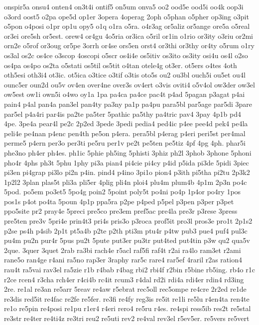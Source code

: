 {onspir5a
onsu4
onten4
on3t4i
ontif5
on5um
onva5
oo2
ood5e
ood5i
oo4k
oop3i
o3ord
oost5
o2pa
ope5d
op1er
3opera
4operag
2oph
o5phan
o5pher
op3ing
o3pit
o5pon
o4posi
o1pr
op1u
opy5
o1q
o1ra
o5ra.
o4r3ag
or5aliz
or5ange
ore5a
o5real
or3ei
ore5sh
or5est.
orew4
or4gu
4o5ria
or3ica
o5ril
or1in
o1rio
or3ity
o3riu
or2mi
orn2e
o5rof
or3oug
or5pe
3orrh
or4se
ors5en
orst4
or3thi
or3thy
or4ty
o5rum
o1ry
os3al
os2c
os4ce
o3scop
4oscopi
o5scr
os4i4e
os5itiv
os3ito
os3ity
osi4u
os4l
o2so
os4pa
os4po
os2ta
o5stati
os5til
os5tit
o4tan
otele4g
ot3er.
ot5ers
o4tes
4oth
oth5esi
oth3i4
ot3ic.
ot5ica
o3tice
o3tif
o3tis
oto5s
ou2
ou3bl
ouch5i
ou5et
ou4l
ounc5er
oun2d
ou5v
ov4en
over4ne
over3s
ov4ert
o3vis
oviti4
o5v4ol
ow3der
ow3el
ow5est
ow1i
own5i
o4wo
oy1a
1pa
pa4ca
pa4ce
pac4t
p4ad
5pagan
p3agat
p4ai
pain4
p4al
pan4a
pan3el
pan4ty
pa3ny
pa1p
pa4pu
para5bl
par5age
par5di
3pare
par5el
p4a4ri
par4is
pa2te
pa5ter
5pathic
pa5thy
pa4tric
pav4
3pay
4p1b
pd4
4pe.
3pe4a
pear4l
pe2c
2p2ed
3pede
3pedi
pedia4
ped4ic
p4ee
pee4d
pek4
pe4la
peli4e
pe4nan
p4enc
pen4th
pe5on
p4era.
pera5bl
p4erag
p4eri
peri5st
per4mal
perme5
p4ern
per3o
per3ti
pe5ru
per1v
pe2t
pe5ten
pe5tiz
4pf
4pg
4ph.
phar5i
phe3no
ph4er
ph4es.
ph1ic
5phie
ph5ing
5phisti
3phiz
ph2l
3phob
3phone
5phoni
pho4r
4phs
ph3t
5phu
1phy
pi3a
pian4
pi4cie
pi4cy
p4id
p5ida
pi3de
5pidi
3piec
pi3en
pi4grap
pi3lo
pi2n
p4in.
pind4
p4ino
3pi1o
pion4
p3ith
pi5tha
pi2tu
2p3k2
1p2l2
3plan
plas5t
pli3a
pli5er
4plig
pli4n
ploi4
plu4m
plum4b
4p1m
2p3n
po4c
5pod.
po5em
po3et5
5po4g
poin2
5point
poly5t
po4ni
po4p
1p4or
po4ry
1pos
pos1s
p4ot
po4ta
5poun
4p1p
ppa5ra
p2pe
p4ped
p5pel
p3pen
p3per
p3pet
ppo5site
pr2
pray4e
5preci
pre5co
pre3em
pref5ac
pre4la
pre3r
p3rese
3press
pre5ten
pre3v
5pri4e
prin4t3
pri4s
pris3o
p3roca
prof5it
pro3l
pros3e
pro1t
2p1s2
p2se
ps4h
p4sib
2p1t
pt5a4b
p2te
p2th
pti3m
ptu4r
p4tw
pub3
pue4
puf4
pul3c
pu4m
pu2n
pur4r
5pus
pu2t
5pute
put3er
pu3tr
put4ted
put4tin
p3w
qu2
qua5v
2que.
3quer
3quet
2rab
ra3bi
rach4e
r5acl
raf5fi
raf4t
r2ai
ra4lo
ram3et
r2ami
rane5o
ran4ge
r4ani
ra5no
rap3er
3raphy
rar5c
rare4
rar5ef
4raril
r2as
ration4
rau4t
ra5vai
rav3el
ra5zie
r1b
r4bab
r4bag
rbi2
rbi4f
r2bin
r5bine
rb5ing.
rb4o
r1c
r2ce
rcen4
r3cha
rch4er
r4ci4b
rc4it
rcum3
r4dal
rd2i
rdi4a
rdi4er
rdin4
rd3ing
2re.
re1al
re3an
re5arr
5reav
re4aw
r5ebrat
rec5oll
rec5ompe
re4cre
2r2ed
re1de
re3dis
red5it
re4fac
re2fe
re5fer.
re3fi
re4fy
reg3is
re5it
re1li
re5lu
r4en4ta
ren4te
re1o
re5pin
re4posi
re1pu
r1er4
r4eri
rero4
re5ru
r4es.
re4spi
ress5ib
res2t
re5stal
re3str
re4ter
re4ti4z
re3tri
reu2
re5uti
rev2
re4val
rev3el
r5ev5er.
re5vers
re5vert
}
